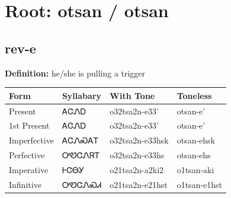 \documentclass{article}%
\begin{document}
%
\normalsize%
\section*{Root: otsan / otsan}%
\subsection*{rev-e}%
\textbf{Definition: }%
he/she is pulling a trigger%
\\[0.5em]%
\begin{tabular}{|l|l|l|l|}%
\hline%
\textbf{Form}&\textbf{Syllabary}&\textbf{With Tone}&\textbf{Toneless}\\%
\hline%
Present&ᎪᏣᏁᎠ&o32tsa2n{-}e33'&otsan{-}e'\\%
1st Present&ᎪᏣᏁᎠ&o32tsa2n{-}e33'&otsan{-}e'\\%
Imperfective&ᎪᏣᏁᏍᎪᎢ&o32tsa2n{-}e33hsk&otsan{-}ehsk\\%
Perfective&ᎤᏬᏣᏁᏒᎢ&o32tsa2n{-}e33hs&otsan{-}ehs\\%
Imperative&ᎰᏣᎾᎩ&o21tsa2n{-}a2ki2&o1tsan{-}aki\\%
Infinitive&ᎤᏬᏣᏁᏍᏗ&o21tsa2n{-}e21hst&o1tsan{-}e1hst\\%
\hline%
\end{tabular}%
\\[1em]%
\end{document}
